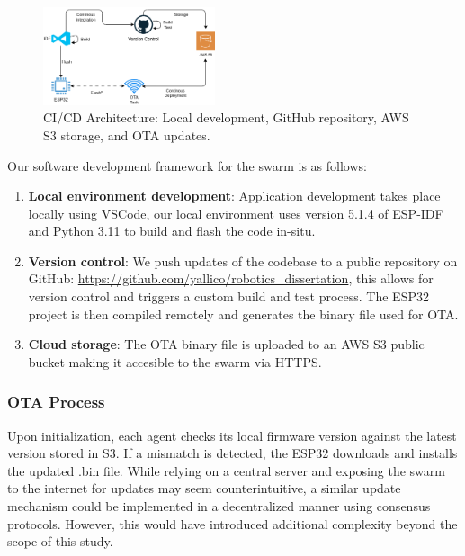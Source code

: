 \documentclass[conference]{IEEEtran}
\begin{document}
\begin{figure}[h]
    \centering
    \includegraphics[width=0.45\textwidth]{architecture.png}
    \caption{CI/CD Architecture: Local development, GitHub repository, AWS S3 storage, and OTA updates.}
    \label{fig:cicd-architecture}
\end{figure}

Our software development framework for the swarm is as follows:

\begin{enumerate}
    \item \textbf{Local environment development}: Application development takes place locally using VSCode, our local environment uses version 5.1.4 of ESP-IDF and Python 3.11 to build and flash the code in-situ.\\
    \item \textbf{Version control}: We push updates of the codebase to a public repository on GitHub: \url{https://github.com/yallico/robotics_dissertation}, this allows for version control and triggers a custom build and test process. The ESP32 project is then compiled remotely and generates the binary file used for OTA.\\
    \item \textbf{Cloud storage}: The OTA binary file is uploaded to an AWS S3 public bucket making it accesible to the swarm via HTTPS.\\
\end{enumerate}

\subsubsection{OTA Process}\label{sec:ota}

Upon initialization, each agent checks its local firmware version against the latest version stored in S3. If a mismatch is detected, the ESP32 downloads and installs the updated .bin file. While relying on a central server and exposing the swarm to the internet for updates may seem counterintuitive, a similar update mechanism could be implemented in a decentralized manner using consensus protocols. However, this would have introduced additional complexity beyond the scope of this study.\\
\end{document}
